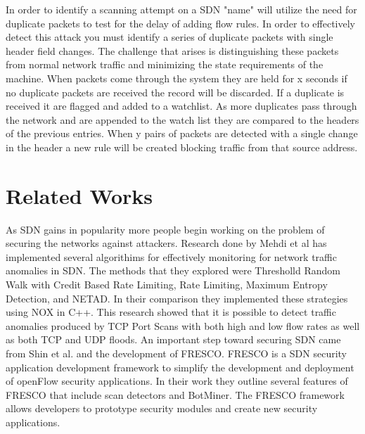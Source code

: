 \documentclass[twocolumn]{article}
\begin{document}
In order to identify a scanning attempt on a SDN "name" will utilize the need for duplicate packets to test for the delay of adding flow rules. In order to effectively detect this attack you must identify a series of duplicate packets with single header field changes. The challenge that arises is distinguishing these packets from normal network traffic and minimizing the state requirements of the machine. When packets come through the system they are held for x seconds if no duplicate packets are received the record will be discarded. If a duplicate is received it are flagged and added to a watchlist. As more duplicates pass through the network and are appended to the watch list they are compared to the headers of the previous entries. When y pairs of packets are detected with a single change in the header a new rule will be created blocking traffic from that source address.

\section{Related Works}

As SDN gains in popularity more people begin working on the problem of securing the networks against attackers. Research done by Mehdi et al \cite{mehdi13} has implemented several algorithims for effectively monitoring for network traffic anomalies in SDN. The methods that they explored were Thresholld Random Walk with Credit Based Rate Limiting, Rate Limiting, Maximum Entropy Detection, and NETAD. In their comparison they implemented these strategies using NOX in C++. This research showed that it is possible to detect traffic anomalies produced by TCP Port Scans with both high and low flow rates as well as both TCP and UDP floods. An important step toward securing SDN came from Shin et al. \cite{FRESCO} and the development of FRESCO. FRESCO is a SDN security application development framework to simplify the development and deployment of openFlow security applications. In their work they outline several features of FRESCO that include scan detectors and BotMiner. The FRESCO framework allows developers to prototype security modules and create new security applications. 




\end{document}
